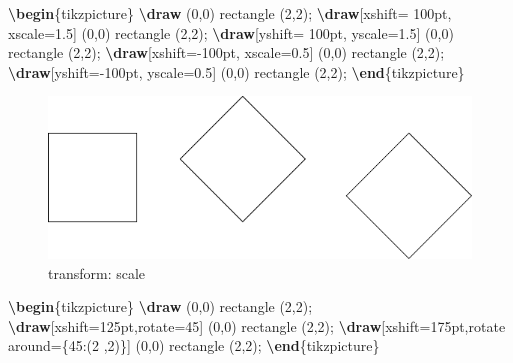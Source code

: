 \documentclass[
]{book}
\newenvironment{Shaded}{\begin{snugshade}}{\end{snugshade}}
\newcommand{\ExtensionTok}[1]{#1}
\newcommand{\FunctionTok}[1]{\textcolor[rgb]{0.13,0.29,0.53}{\textbf{#1}}}
\newcommand{\KeywordTok}[1]{\textcolor[rgb]{0.13,0.29,0.53}{\textbf{#1}}}
\newcommand{\NormalTok}[1]{#1}
\theoremstyle{definition}
\theoremstyle{definition}
\theoremstyle{definition}
\theoremstyle{definition}
\theoremstyle{remark}
\begin{document}
\begin{Shaded}
\begin{Highlighting}[]
\KeywordTok{\textbackslash{}begin}\NormalTok{\{}\ExtensionTok{tikzpicture}\NormalTok{\}}
  \FunctionTok{\textbackslash{}draw}\NormalTok{ (0,0) rectangle (2,2);}
  \FunctionTok{\textbackslash{}draw}\NormalTok{[xshift= 100pt, xscale=1.5] (0,0) rectangle (2,2);}
  \FunctionTok{\textbackslash{}draw}\NormalTok{[yshift= 100pt, yscale=1.5] (0,0) rectangle (2,2);}
  \FunctionTok{\textbackslash{}draw}\NormalTok{[xshift={-}100pt, xscale=0.5] (0,0) rectangle (2,2);}
  \FunctionTok{\textbackslash{}draw}\NormalTok{[yshift={-}100pt, yscale=0.5] (0,0) rectangle (2,2);}
\KeywordTok{\textbackslash{}end}\NormalTok{\{}\ExtensionTok{tikzpicture}\NormalTok{\}}
\end{Highlighting}
\end{Shaded}

\begin{figure}
\includegraphics[width=0.75\linewidth]{202401311000-TikZ_files/figure-latex/unnamed-chunk-51-1} \caption{transform: scale}\label{fig:unnamed-chunk-51}
\end{figure}

\begin{Shaded}
\begin{Highlighting}[]
\KeywordTok{\textbackslash{}begin}\NormalTok{\{}\ExtensionTok{tikzpicture}\NormalTok{\}}
  \FunctionTok{\textbackslash{}draw}\NormalTok{ (0,0) rectangle (2,2);}
  \FunctionTok{\textbackslash{}draw}\NormalTok{[xshift=125pt,rotate=45] (0,0) rectangle (2,2);}
  \FunctionTok{\textbackslash{}draw}\NormalTok{[xshift=175pt,rotate around=\{45:(2 ,2)\}] (0,0) rectangle (2,2);}
\KeywordTok{\textbackslash{}end}\NormalTok{\{}\ExtensionTok{tikzpicture}\NormalTok{\}}
\end{Highlighting}
\end{Shaded}
\end{document}
